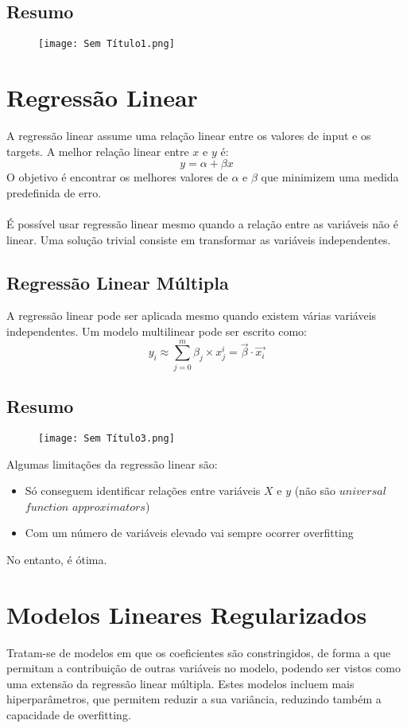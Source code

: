 \documentclass[10pt,a4paper]{report}
\begin{document}
\subsection{Resumo}
\begin{figure}[H]
\centering
\texttt{[image: Sem Título1.png]}
\end{figure}
\section{Regressão Linear}
A regressão linear assume uma relação linear entre os valores de input e os targets. A melhor relação linear entre $x$ e $y$ é:
$$
y = \alpha + \beta x
$$
O objetivo é encontrar os melhores valores de $\alpha$ e $\beta$ que minimizem uma medida predefinida de erro.\\
\\
É possível usar regressão linear mesmo quando a relação entre as variáveis não é linear. Uma solução trivial consiste em transformar as variáveis independentes.
\subsection{Regressão Linear Múltipla}
A regressão linear pode ser aplicada mesmo quando existem várias variáveis independentes. Um modelo multilinear pode ser escrito como:
$$
y_i \approx \sum_{j = 0}^m \beta_j \times x_j^i = \vec{\beta} \cdot \vec{x_i}
$$
\subsection{Resumo}
\begin{figure}[H]
\centering
\texttt{[image: Sem Título3.png]}
\end{figure}
Algumas limitações da regressão linear são:
\begin{itemize}
\item Só conseguem identificar relações entre variáveis $X$ e $y$ (não são $universal$ $function$ $approximators$)
\item Com um número de variáveis elevado vai sempre ocorrer overfitting
\end{itemize}
No entanto, é ótima.
\section{Modelos Lineares Regularizados}
Tratam-se de modelos em que os coeficientes são constringidos, de forma a que permitam a contribuição de outras variáveis no modelo, podendo ser vistos como uma extensão da regressão linear múltipla. Estes modelos incluem mais hiperparâmetros, que permitem reduzir a sua variância, reduzindo também a capacidade de overfitting.
\end{document}
